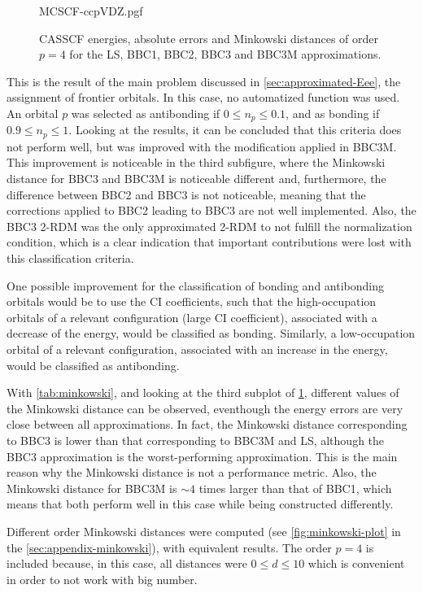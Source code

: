     \begin{figure}[tb!]
        \centering
        {MCSCF-ccpVDZ.pgf}
        \caption{CASSCF energies, absolute errors and Minkowski distances of order 
        $p=4$ for the LS, BBC1, BBC2, BBC3 and BBC3M approximations.}
        \label{fig:plot_pdf}
    \end{figure}

    This is the result of the main problem discussed in \cref{sec:approximated-Eee},
    the assignment of frontier orbitals.
    In this case, no automatized function was used.
    An orbital $p$ was selected as antibonding if $0 \le n_p \le 0.1$, and as
    bonding if $0.9 \le n_p \le 1$.
    Looking at the results, it can be concluded that this criteria does not perform
    well, but was improved with the modification applied in BBC3M.
    This improvement is noticeable in the third subfigure, where the Minkowski distance
    for BBC3 and BBC3M is noticeable different and, furthermore, the difference
    between BBC2 and BBC3 is not noticeable, meaning that the corrections
    applied to BBC2 leading to BBC3 are not well implemented.
    Also, the BBC3 2-RDM was the only approximated 2-RDM to not fulfill the normalization
    condition, which is a clear indication that important contributions were lost
    with this classification criteria.

    One possible improvement for the classification of bonding and antibonding
    orbitals would be to use the CI coefficients, such that the high-occupation
    orbitals of a relevant configuration (large CI coefficient), associated with
    a decrease of the energy, would be classified as bonding.
    Similarly, a low-occupation orbital of a relevant configuration, associated
    with an increase in the energy, would be classified as antibonding.

    With \cref{tab:minkowski}, and looking at the third subplot of \cref{fig:plot_pdf},
    different values of the Minkowski distance can be observed, eventhough the
    energy errors are very close between all approximations.
    In fact, the Minkowski distance corresponding to BBC3 is lower than that
    corresponding to BBC3M and LS, although the BBC3 approximation is the worst-performing
    approximation.
    This is the main reason why the Minkowski distance is not a performance metric.
    Also, the Minkowski distance for BBC3M is $\sim 4$ times larger than that of
    BBC1, which means that both perform well in this case while being constructed
    differently.

    Different order Minkowski distances were computed (see \cref{fig:minkowski-plot}
    in the \cref{sec:appendix-minkowski}), with equivalent results.
    The order $p=4$ is included because, in this case, all distances were
    $0 \le d \le 10$ which is convenient in order to not work with big number.
